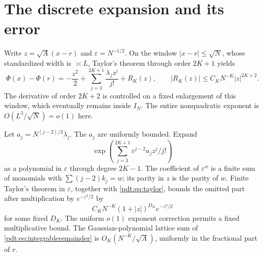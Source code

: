 \section{The discrete expansion and its error}
\label{pdt:sec:transfer}
Write $z=\sqrt A(x-r)$ and $\varepsilon=N^{-1/2}$. On the window $|x-r|\le\sqrt N$, whose standardized width is $\asymp L$, Taylor's theorem through order $2K+1$ yields
\begin{equation}\label{pdt:eq:taylor}
 \Phi(x)-\Phi(r)=-\frac{z^2}2+
 \sum_{j=3}^{2K+1}\frac{\lambda_jz^j}{j!}+R_K(z),
 \qquad |R_K(z)|\le C_KN^{-K}|z|^{2K+2}.
\end{equation}
The derivative of order $2K+2$ is controlled on a fixed enlargement of this window, which eventually remains inside $I_N$. The entire nonquadratic exponent is $O(L^3/\sqrt N)=o(1)$ here.

Let $a_j=N^{(j-2)/2}\lambda_j$. The $a_j$ are uniformly bounded. Expand
\[
 \exp\left(\sum_{j=3}^{2K+1}\varepsilon^{j-2}a_jz^j/j!\right)
\]
as a polynomial in $\varepsilon$ through degree $2K-1$. The coefficient of $\varepsilon^w$ is a finite sum of monomials with $\sum(j-2)k_j=w$; its parity in $z$ is the parity of $w$. Finite Taylor's theorem in $\varepsilon$, together with \eqref{pdt:eq:taylor}, bounds the omitted part after multiplication by $e^{-z^2/2}$ by
\begin{equation}\label{pdt:eq:integrableremainder}
 C_KN^{-K}(1+|z|)^{D_K}e^{-z^2/2}
\end{equation}
for some fixed $D_K$. The uniform $o(1)$ exponent correction permits a fixed multiplicative bound. The Gaussian-polynomial lattice sum of \eqref{pdt:eq:integrableremainder} is $O_K(N^{-K}/\sqrt A)$, uniformly in the fractional part of $r$.

